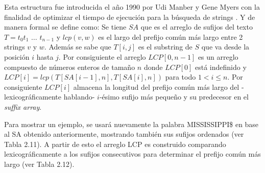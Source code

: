 Esta estructura fue introducida el año 1990 por Udi Manber y Gene Myers con la finalidad de optimizar el tiempo de ejecución para la búsqueda de strings \cite{suffixarray1}. Y de manera formal se define como: Se tiene $SA$ que es el arreglo de sufijos del texto $T=t_{0}t_{1}$ $\ldots$ $t_{n-1}$ y $lcp(v,w)$ es el largo del prefijo común más largo entre 2 strings $v$ y $w$. Además se sabe que $T[i,j]$ es el substring de $S$ que va desde la posición $i$ hasta $j$. Por consiguiente el arreglo $LCP[0,n-1]$ es un arreglo compuesto de números enteros de tamaño $n$ donde $LCP[0]$ está indefinido y $LCP[i] = lcp(T[SA[i-1],n], T[SA[i],n])$ para todo $1 < i \leq n$. Por consiguiente $LCP[i]$ almacena la longitud del prefijo común más largo del -lexicográficamente hablando-  $i$-ésimo sufijo más pequeño y su predecesor en el \textit{suffix array}.

Para mostrar un ejemplo, se usará nuevamente la palabra MISSISSIPPI\$ en base al SA obtenido anteriormente, mostrando también sus sufijos ordenados (ver Tabla 2.11). A partir de esto el arreglo LCP es construido comparando lexicográficamente a los sufijos consecutivos para determinar el prefijo común más largo (ver Tabla 2.12).


